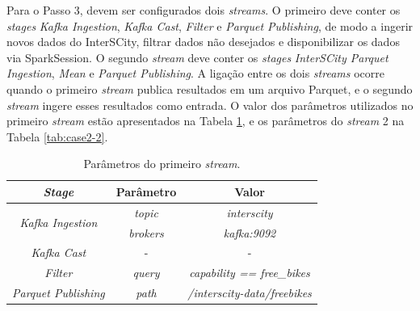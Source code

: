 Para o Passo 3, devem ser configurados dois \textit{streams}. O primeiro deve
conter os \textit{stages} \textit{Kafka Ingestion}, \textit{Kafka Cast},
\textit{Filter} e \textit{Parquet Publishing}, de modo a ingerir novos dados
do InterSCity, filtrar dados não desejados e disponibilizar os dados via
SparkSession. O segundo \textit{stream} deve conter os \textit{stages}
\textit{InterSCity Parquet Ingestion}, \textit{Mean} e \textit{Parquet
Publishing}. A ligação entre os dois \textit{streams} ocorre quando o primeiro
\textit{stream} publica resultados em um arquivo Parquet, e o segundo
\textit{stream} ingere esses resultados como entrada. O valor dos parâmetros
utilizados no primeiro \textit{stream} estão apresentados na Tabela
\ref{tab:case2-1}, e os parâmetros do \textit{stream} 2 na Tabela
\ref{tab:case2-2}.

\begin{table}[]
    \centering
    \caption{Parâmetros do primeiro \textit{stream}.}
    \label{tab:case2-1}
    \begin{tabular}{|c|c|c|}
        \hline
        \textit{\textbf{Stage}}                   & \textbf{Parâmetro} & \textbf{Valor}                      \\ \hline
        \multirow{2}{*}{\textit{Kafka Ingestion}} & \textit{topic}     & \textit{interscity}                 \\ \cline{2-3} 
                                                  & \textit{brokers}   & \textit{kafka:9092}                 \\ \hline
                                                  \textit{Kafka Cast}                       & -                  & -                                   \\ \hline
                                                  \textit{Filter}                           & \textit{query}     & \textit{capability == free\_bikes}  \\ \hline
                                                  \textit{Parquet Publishing}               & \textit{path}      & \textit{/interscity-data/freebikes} \\ \hline
    \end{tabular}
\end{table}

